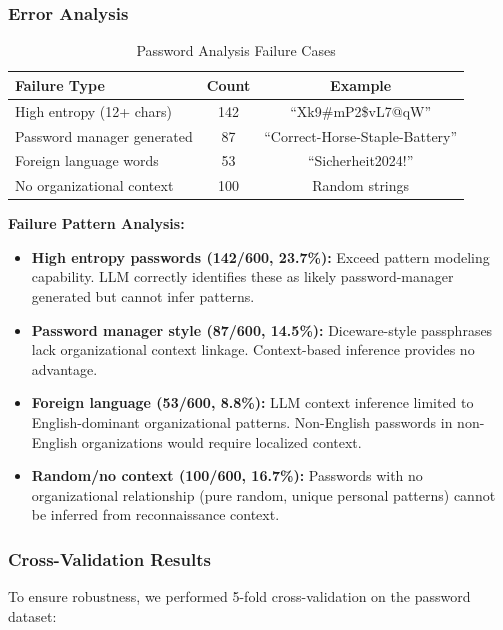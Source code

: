 \documentclass[preprint,12pt]{elsarticle}
\begin{document}
\subsubsection{Error Analysis}

\begin{table}[htbp]
\centering
\caption{Password Analysis Failure Cases}
\label{tab:pw_errors}
\begin{tabular}{lcc}
\toprule
\textbf{Failure Type} & \textbf{Count} & \textbf{Example} \\
\midrule
High entropy (12+ chars) & 142 & ``Xk9\#mP2\$vL7@qW'' \\
Password manager generated & 87 & ``Correct-Horse-Staple-Battery'' \\
Foreign language words & 53 & ``Sicherheit2024!'' \\
No organizational context & 100 & Random strings \\
\bottomrule
\end{tabular}
\end{table}

\textbf{Failure Pattern Analysis:}
\begin{itemize}
    \item \textbf{High entropy passwords (142/600, 23.7\%):} Exceed pattern modeling capability. LLM correctly identifies these as likely password-manager generated but cannot infer patterns.
    \item \textbf{Password manager style (87/600, 14.5\%):} Diceware-style passphrases lack organizational context linkage. Context-based inference provides no advantage.
    \item \textbf{Foreign language (53/600, 8.8\%):} LLM context inference limited to English-dominant organizational patterns. Non-English passwords in non-English organizations would require localized context.
    \item \textbf{Random/no context (100/600, 16.7\%):} Passwords with no organizational relationship (pure random, unique personal patterns) cannot be inferred from reconnaissance context.
\end{itemize}

\subsubsection{Cross-Validation Results}

To ensure robustness, we performed 5-fold cross-validation on the password dataset:
\end{document}

